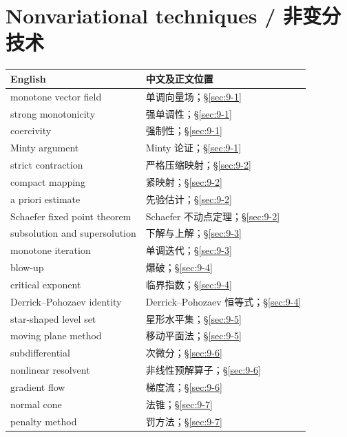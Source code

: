 \section*{Nonvariational techniques / 非变分技术}
\begin{center}\small
\begin{tabular}{@{}p{.53\linewidth}p{.38\linewidth}@{}}
\textbf{English}&\textbf{中文及正文位置}\\\hline
monotone vector field & 单调向量场；\S\ref{sec:9-1}\\
strong monotonicity & 强单调性；\S\ref{sec:9-1}\\
coercivity & 强制性；\S\ref{sec:9-1}\\
Minty argument & Minty 论证；\S\ref{sec:9-1}\\
strict contraction & 严格压缩映射；\S\ref{sec:9-2}\\
compact mapping & 紧映射；\S\ref{sec:9-2}\\
a priori estimate & 先验估计；\S\ref{sec:9-2}\\
Schaefer fixed point theorem & Schaefer 不动点定理；\S\ref{sec:9-2}\\
subsolution and supersolution & 下解与上解；\S\ref{sec:9-3}\\
monotone iteration & 单调迭代；\S\ref{sec:9-3}\\
blow-up & 爆破；\S\ref{sec:9-4}\\
critical exponent & 临界指数；\S\ref{sec:9-4}\\
Derrick--Pohozaev identity & Derrick--Pohozaev 恒等式；\S\ref{sec:9-4}\\
star-shaped level set & 星形水平集；\S\ref{sec:9-5}\\
moving plane method & 移动平面法；\S\ref{sec:9-5}\\
subdifferential & 次微分；\S\ref{sec:9-6}\\
nonlinear resolvent & 非线性预解算子；\S\ref{sec:9-6}\\
gradient flow & 梯度流；\S\ref{sec:9-6}\\
normal cone & 法锥；\S\ref{sec:9-7}\\
penalty method & 罚方法；\S\ref{sec:9-7}
\end{tabular}
\end{center}
\clearpage

